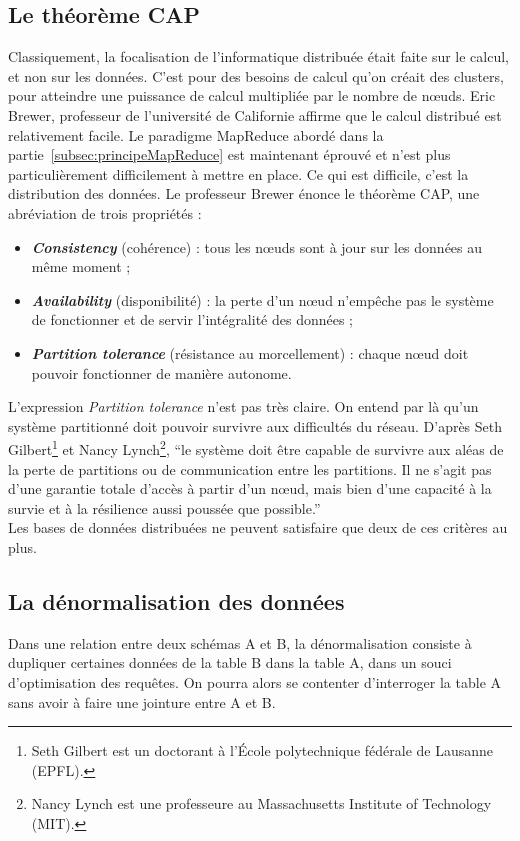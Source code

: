 \subsection{Le théorème CAP}
	Classiquement, la focalisation de l'informatique distribuée était faite sur le calcul, et non sur les données. C'est pour des besoins de calcul qu'on créait des clusters, pour atteindre une puissance de calcul multipliée par le nombre de nœuds. Eric Brewer, professeur de l'université de Californie affirme que le calcul distribué est relativement facile. Le paradigme MapReduce abordé dans la partie~\ref{subsec:principeMapReduce} est maintenant éprouvé et n'est plus particulièrement difficilement à mettre en place. Ce qui est difficile, c'est la distribution des données. Le professeur Brewer énonce le théorème CAP, une abréviation de trois propriétés :
	\vspace{10px}
	\begin{itemize}
		\item \textbf{\textit{Consistency}} (cohérence) : tous les nœuds sont à jour sur les données au même moment ; 
		\item \textbf{\textit{Availability}} (disponibilité) : la perte d'un nœud n'empêche pas le système de fonctionner et de servir l'intégralité des données ; 
		\item \textbf{\textit{Partition tolerance}} (résistance au morcellement) : chaque nœud doit pouvoir fonctionner de manière autonome. 
	\end{itemize}
	\vspace{20px}
	L'expression \textit{Partition tolerance} n'est pas très claire. On entend par là qu'un système partitionné doit pouvoir survivre aux difficultés du réseau. D'après Seth Gilbert\footnote{Seth Gilbert est un doctorant à l'École polytechnique fédérale de Lausanne (EPFL).} et Nancy Lynch\footnote{Nancy Lynch est une professeure au Massachusetts Institute of Technology (MIT).}, \enquote{le système doit être capable de survivre aux aléas de la perte de partitions ou de communication entre les partitions. Il ne s'agit pas d'une garantie totale d'accès à partir d'un nœud, mais bien d'une capacité à la survie et à la résilience aussi poussée que possible.}\\

	Les bases de données distribuées ne peuvent satisfaire que deux de ces critères au plus.

\subsection{La dénormalisation des données}
	Dans une relation entre deux schémas A et B, la dénormalisation consiste à dupliquer certaines données de la table B dans la table A, dans un souci d'optimisation des requêtes. On pourra alors se contenter d'interroger la table A sans avoir à faire une jointure entre A et B.\\

